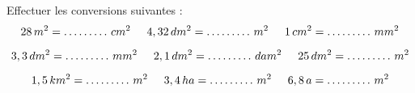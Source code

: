 \begin{pageAD}
 
 
Effectuer les conversions suivantes :
\[28\,m^2=\dots \ldots \ldots\,cm^2\hspace{.5cm}4,32\,dm^2=\dots \ldots \ldots\,m^2\hspace{.5cm}1\,cm^2=\dots \ldots \ldots\,mm^2\]

\[3,3\,dm^2=\dots \ldots \ldots\,mm^2\hspace{.5cm}2,1\,dm^2=\dots \ldots \ldots\,dam^2\hspace{.5cm}25\,dm^2=\dots \ldots \ldots\,m^2\]
 
\[1,5\,km^2=\dots \ldots \ldots\,m^2\hspace{.5cm}3,4\,ha =\dots \ldots \ldots\,m^2\hspace{.5cm}6,8\,a=\dots \ldots \ldots\,m^2\]

\end{pageAD} 



